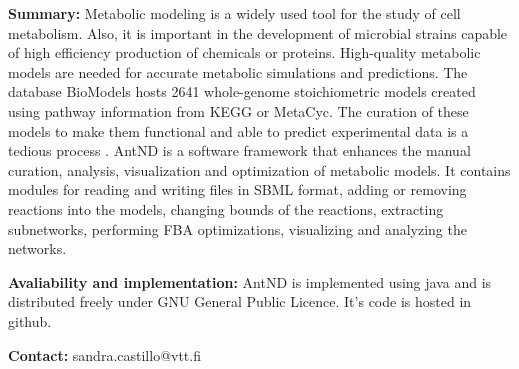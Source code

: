 
\textbf{Summary:} Metabolic modeling is a widely used tool for the study of cell metabolism. Also, it is important in the development of microbial strains capable of high efficiency production of chemicals or proteins. High-quality metabolic models are needed for accurate metabolic simulations and predictions. The database BioModels \cite{juty_biomodels:_2015} hosts 2641 whole-genome stoichiometric models created using pathway information from KEGG or MetaCyc. The curation of these models to make them functional and able to predict experimental data is a tedious process \cite{thiele_protocol_2010}.  AntND is a software framework that enhances the manual curation, analysis, visualization and optimization of metabolic models. It contains modules for reading and writing files in SBML format, adding or removing reactions into the models, changing bounds of the reactions, extracting subnetworks, performing FBA optimizations, visualizing and analyzing the networks. 

\textbf{Avaliability and implementation:} AntND is implemented using java and is distributed freely under GNU General Public Licence. It's code is hosted in github. 

\textbf{Contact:} sandra.castillo@vtt.fi
